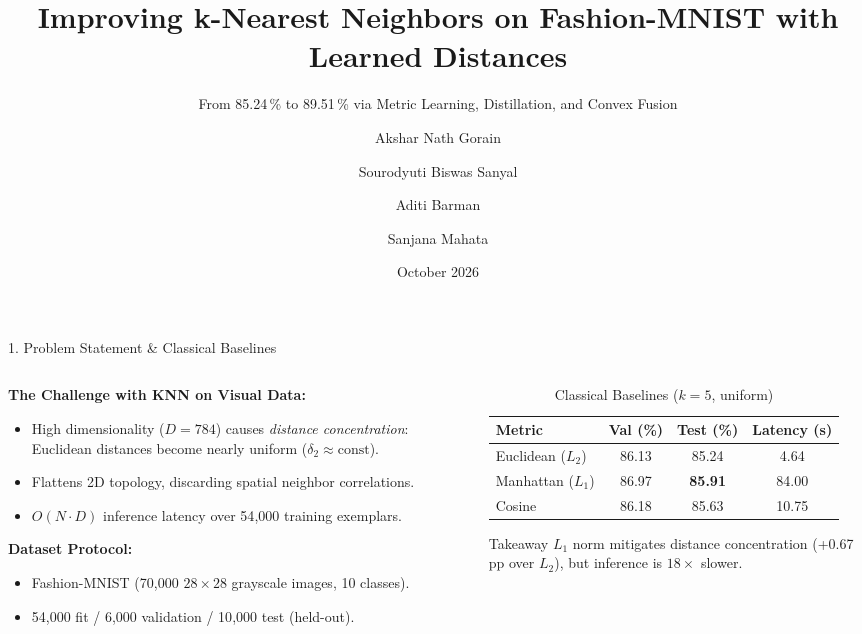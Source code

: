 \documentclass[aspectratio=169,11pt]{beamer}
\title[Fashion-MNIST KNN Optimization]{Improving k-Nearest Neighbors on Fashion-MNIST with Learned Distances}
\subtitle{From 85.24\,\% to 89.51\,\% via Metric Learning, Distillation, and Convex Fusion}
\author[Gorain, Sanyal, Barman, Mahata]{Akshar Nath Gorain \and Sourodyuti Biswas Sanyal \and Aditi Barman \and Sanjana Mahata}
\institute[TIU]{Techno India University, West Bengal \\ \medskip \small Machine Learning Coursework Project}
\date{October 2026}
\begin{document}
\begin{frame}
  \titlepage
\end{frame}

\begin{frame}{1. Problem Statement \& Classical Baselines}
\begin{columns}
\begin{column}{0.55\textwidth}
\textbf{The Challenge with KNN on Visual Data:}
\begin{itemize}
  \item High dimensionality ($D=784$) causes \emph{distance concentration}: Euclidean distances become nearly uniform ($\delta_2 \approx \text{const}$).
  \item Flattens 2D topology, discarding spatial neighbor correlations.
  \item $O(N \cdot D)$ inference latency over 54{,}000 training exemplars.
\end{itemize}
\vspace{0.3em}
\textbf{Dataset Protocol:}
\begin{itemize}
  \item Fashion-MNIST (70{,}000 $28\times28$ grayscale images, 10 classes).
  \item 54{,}000 fit / 6{,}000 validation / 10{,}000 test (held-out).
\end{itemize}
\end{column}

\begin{column}{0.45\textwidth}
\begin{table}
\footnotesize
\centering
\caption{Classical Baselines ($k=5$, uniform)}
\begin{tabular}{lccc}
\toprule
Metric & Val (\%) & Test (\%) & Latency (s) \\
\midrule
Euclidean ($L_2$) & 86.13 & 85.24 & 4.64 \\
Manhattan ($L_1$) & 86.97 & \textbf{85.91} & 84.00 \\
Cosine            & 86.18 & 85.63 & 10.75 \\
\bottomrule
\end{tabular}
\end{table}
\small
\begin{alertblock}{Takeaway}
$L_1$ norm mitigates distance concentration (+0.67\,pp over $L_2$), but inference is $18\times$ slower.
\end{alertblock}
\end{column}
\end{columns}
\end{frame}
\end{document}
